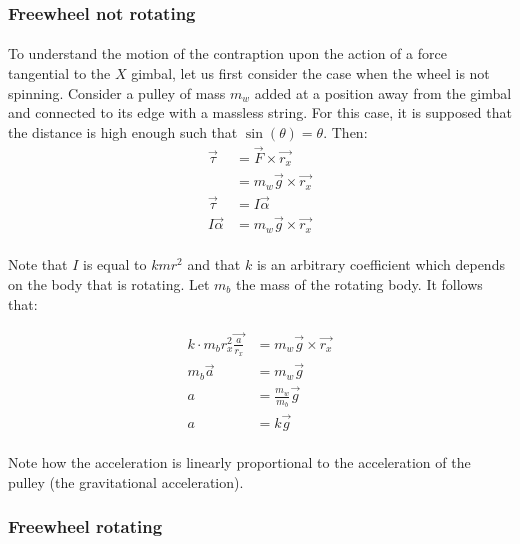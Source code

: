 \documentclass[a4paper]{article}
\begin{document}
\subsubsection{Freewheel not rotating}

\paragraph*{}
To understand the motion of the contraption upon the action of a force
tangential to the $X$ gimbal, let us first consider the case when the wheel is
not spinning. Consider a pulley of mass $m_w$ added at a position away from the
gimbal and connected to its edge with a massless string. For this case, it is
supposed that the distance is high enough such that $\sin(\theta) = \theta$.
Then:
\begin{align*}
  \vec{\tau} &= \vec{F} \times \vec{r_x} \\
  &= m_w \vec{g} \times \vec{r_x} \\
  \vec{\tau} &= I \vec{\alpha} \\
  I \vec{\alpha} &= m_w \vec{g} \times \vec{r_x}
\end{align*}

\paragraph*{}
Note that $I$ is equal to $k m r^2$ and that $k$ is an arbitrary coefficient
which depends on the body that is rotating. Let $m_b$ the mass of the rotating
body. It follows that:

\begin{align*}
  k \cdot m_b r_x^2 \vec{\frac{a}{r_x}} &= m_w \vec{g} \times \vec{r_x} \\
  m_b \vec{a} &= m_w \vec{g} \\
  a &= \frac{m_w}{m_b} \vec{g} \\
  a &= k \vec{g}
\end{align*}

\paragraph*{}
Note how the acceleration is linearly proportional to the acceleration of the
pulley (the gravitational acceleration).

\subsubsection{Freewheel rotating} \label{sec:fw-rotating}
\end{document}
